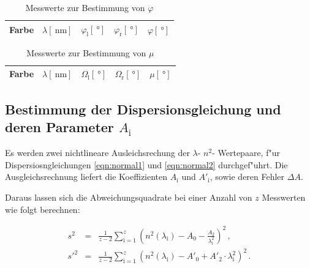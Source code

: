 		\begin{table}[h!]
			\begin{center}
				\caption{Messwerte zur Bestimmung von $\varphi$ \label{table:phi}}
				\begin{tabular}{|c|c|c|c|c|}
					\hline
						Farbe & $\lambda [\SI{}{\nano \meter}]$ & $\varphi_\mathrm{l} [\SI{}{\degree}]$ & $\varphi_\mathrm{r} [\SI{}{\degree}]$ & $\varphi [\SI{}{\degree}]$ \\
					\hline 
					\hline
						
					\hline 
				\end{tabular}
			\end{center}
		\end{table}		

		\begin{table}[h!]
			\begin{center}
				\caption{Messwerte zur Bestimmung von $\mu$ \label{table:mu}}
				\begin{tabular}{|c|c|c|c|c|}
					\hline
						Farbe & $\lambda [\SI{}{\nano \meter}]$ & $\Omega_\mathrm{l} [\SI{}{\degree}]$ & $\Omega_\mathrm{r} [\SI{}{\degree}]$ & $\mu [\SI{}{\degree}]$ \\
					\hline 
					\hline
						
					\hline 
				\end{tabular}
			\end{center}
		\end{table}		

	\clearpage

	\subsection{Bestimmung der Dispersionsgleichung und deren Parameter $A_\mathrm{i}$}
	\label{subsec:dispersionskurve}
		Es werden zwei nichtlineare Ausleichsrechung der $\lambda$- $n^2$- Wertepaare, f"ur Dispersiosngleichungen \eqref{eqn:normal1} und \eqref{eqn:normal2} durchgef"uhrt.
		Die Ausgleichsrechnung liefert die Koeffizienten $A_\mathrm{i}$ und $A'_\mathrm{i}$, sowie deren Fehler $\Delta A$.

		Daraus lassen sich die Abweichungsquadrate bei einer Anzahl von $z$ Messwerten wie folgt berechnen:

		\begin{eqnarray*}
			s^2 & = & \frac{1}{z - 2} \sum_{\mathrm{i} = 1}^z{\left(n^2(\lambda_\mathrm{i}) - A_0 - \frac{A_2}{\lambda_\mathrm{i}^2}\right)^2} \,, \\
			s'^2 & = & \frac{1}{z - 2} \sum_{\mathrm{i} = 1}^z{\left(n^2(\lambda_\mathrm{i}) - A'_0 + A'_2 \cdot \lambda_\mathrm{i}^2 \right)^2} \,. \\
		\end{eqnarray*}

